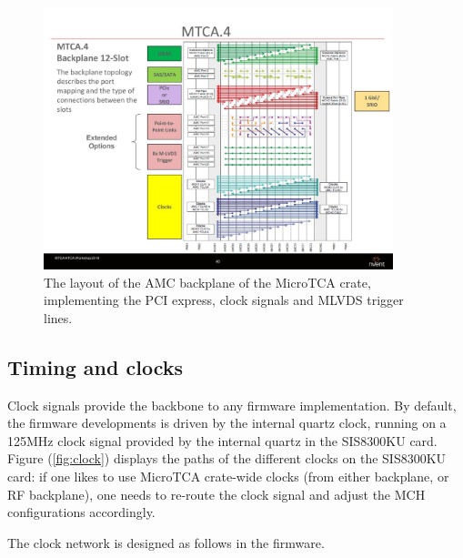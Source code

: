 \documentclass[12pt]{amsart}
\begin{document}
\begin{figure}[htbp] %
   \centering
   \includegraphics[width=4in]{im/bp.jpeg} 
   \caption{The layout of the AMC backplane of the MicroTCA crate, implementing the PCI express, clock signals and MLVDS trigger lines.}
   \label{fig:bp}
\end{figure}


\subsection{Timing and clocks}

Clock signals provide the backbone to any firmware implementation.
By default, the firmware developments is driven by the internal quartz clock, running 
on  a 125MHz clock signal provided by the internal quartz in the SIS8300KU card.
Figure (\ref{fig:clock}) displays the paths of the different clocks on the SIS8300KU card:
if one likes to use MicroTCA crate-wide clocks (from either backplane, or RF backplane), one needs to re-route the clock signal
and adjust the MCH configurations accordingly.

The clock network is designed as follows in the firmware.
\end{document}
